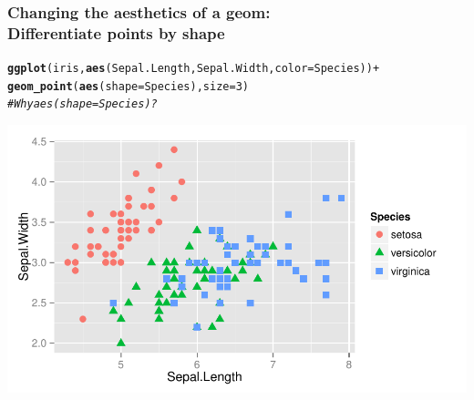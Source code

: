 \documentclass{beamer}\usepackage[]{graphicx}\usepackage[]{color}
\makeatletter
\newcommand{\hlnum}[1]{\textcolor[rgb]{0.686,0.059,0.569}{#1}}%
\newcommand{\hlcom}[1]{\textcolor[rgb]{0.678,0.584,0.686}{\textit{#1}}}%
\newcommand{\hlopt}[1]{\textcolor[rgb]{0,0,0}{#1}}%
\newcommand{\hlstd}[1]{\textcolor[rgb]{0.345,0.345,0.345}{#1}}%
\newcommand{\hlkwc}[1]{\textcolor[rgb]{0.333,0.667,0.333}{#1}}%
\newcommand{\hlkwd}[1]{\textcolor[rgb]{0.737,0.353,0.396}{\textbf{#1}}}%
\newenvironment{kframe}{%
 \def\at@end@of@kframe{}%
 \ifinner\ifhmode%
  \def\at@end@of@kframe{\end{minipage}}%
  \begin{minipage}{\columnwidth}%
 \fi\fi%
 \def\FrameCommand##1{\hskip\@totalleftmargin \hskip-\fboxsep
 \colorbox{shadecolor}{##1}\hskip-\fboxsep
     \hskip-\linewidth \hskip-\@totalleftmargin \hskip\columnwidth}%
 \MakeFramed {\advance\hsize-\width
   \@totalleftmargin\z@ \linewidth\hsize
   \@setminipage}}%
 {\par\unskip\endMakeFramed%
 \at@end@of@kframe}
\newenvironment{knitrout}{}{} %
\makeatother
\begin{document}
\begin{frame}[fragile]
\frametitle{Changing the aesthetics of a geom: \\Differentiate points by shape}
\begin{knitrout}\footnotesize
{}\color{fgcolor}\begin{kframe}
\begin{alltt}
\hlkwd{ggplot}\hlstd{(iris,} \hlkwd{aes}\hlstd{(Sepal.Length, Sepal.Width,} \hlkwc{color} \hlstd{= Species))} \hlopt{+}
\hlkwd{geom_point}\hlstd{(}\hlkwd{aes}\hlstd{(}\hlkwc{shape} \hlstd{= Species),} \hlkwc{size} \hlstd{=} \hlnum{3}\hlstd{)}
\hlcom{# Why aes(shape = Species)?}
\end{alltt}
\end{kframe}

{\centering \includegraphics[width=.75\linewidth]{figure/first_plot_shape_} 

}



\end{knitrout}
\end{frame}

\end{document}
